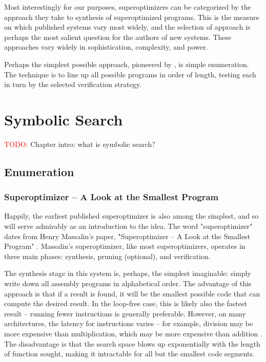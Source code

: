 \documentclass[12pt,twoside]{reedthesis}
\newcommand{\red}[1]{\textcolor{red}{#1}}
\begin{document}
    Most interestingly for our purposes, superoptimizers can be categorized by the approach they take to synthesis of superoptimized programs.
    This is the measure on which published systems vary most widely, and the selection of approach is perhaps the most salient question for the authors of new systems.
    These approaches vary widely in sophistication, complexity, and power.
    
    Perhaps the simplest possible approach, pioneered by \cite{massalin1987superoptimizer}, is simple enumeration. 
    The technique is to line up all possible programs in order of length, testing each in turn by the selected verification strategy. 

\chapter{Symbolic Search}
    \red{TODO:} Chapter intro: what is symbolic search?
    \section{Enumeration}
        \subsection{Superoptimizer -- A Look at the Smallest Program}
            Happily, the earliest published superoptimizer is also among the simplest, and so will serve admirably as an introduction to the idea.
            The word "superoptimizer" dates from Henry Massalin's paper, "Superoptimizer -- A Look at the Smallest Program" \cite{massalin1987superoptimizer}.
            Massalin's superoptimizer, like most superoptimizers, operates in three main phases: synthesis, pruning (optional), and verification.
                
            The synthesis stage in this system is, perhaps, the simplest imaginable: simply write down all assembly programs in alphabetical order.
            The advantage of this approach is that if a result is found, it will be the smallest possible code that can compute the desired result.
            In the loop-free case, this is likely also the fastest result -- running fewer instructions is generally preferable.
            However, on many architectures, the latency for instructions varies -- for example, division may be more expensive than multiplication, which may be more expensive than addition \cite{fog1996instructiontables}.
            The disadvantage is that the search space blows up exponentially with the length of function sought, making it intractable for all but the smallest code segments.
                
\end{document}
